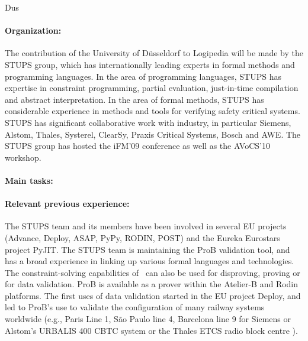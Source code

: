 \begin{sitedescription}{Dus}

\paragraph{Organization:}


The contribution of the University of D\"usseldorf to Logipedia will be made by the STUPS group, 
which has internationally leading experts in formal methods and programming languages.
In the area of programming languages, STUPS has expertise in constraint programming,
 partial evaluation, just-in-time compilation and abstract interpretation.
In the area of formal methods, STUPS has considerable experience in methods and
 tools for verifying safety critical systems.
STUPS has significant collaborative work with industry,
in particular Siemens, Alstom, Thales, Systerel, ClearSy, Praxis Critical Systems, Bosch  and AWE.
The STUPS group has hosted the iFM'09 conference as well as the AVoCS'10 workshop.



\paragraph{Main tasks:}

\begin{compactitem}
\item{} 
\end{compactitem}


\paragraph{Relevant previous experience:}



The STUPS team and its members have been involved in several EU projects
 (Advance, Deploy, ASAP, PyPy, RODIN, POST) and the Eureka Eurostars project PyJIT.
The STUPS team is maintaining the ProB validation tool, and has a broad experience
 in linking up various formal languages and technologies.
The constraint-solving capabilities of \prob\ can also be used for 
  disproving, proving or for data validation.
ProB is available as a prover within the Atelier-B and Rodin platforms.
The first uses of data validation started in the EU project Deploy, and led to
 ProB's use to validate the configuration of many railway systems worldwide
 (e.g.,
 Paris Line 1,  S\~{a}o Paulo line 4, Barcelona line 9 for Siemens
 or Alstom's URBALIS 400 CBTC system %
 or the Thales ETCS radio block centre
 ).


\end{sitedescription}
